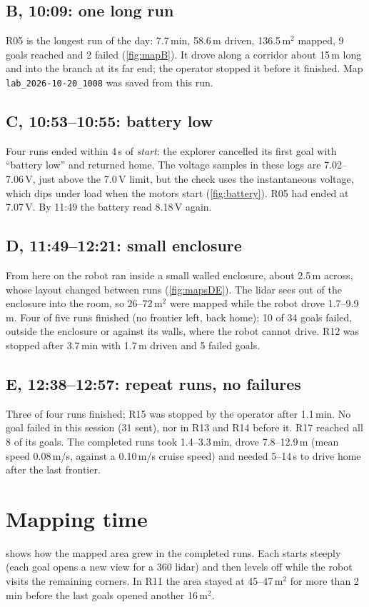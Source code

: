\documentclass[10pt]{article}
\begin{document}
\subsection*{B, 10:09: one long run}
R05 is the longest run of the day: 7.7\,min, 58.6\,m driven, 136.5\,m$^2$ mapped, 9 goals reached
and 2 failed (\cref{fig:mapB}). It drove along a corridor about 15\,m long and into the branch at its far end;
the operator stopped it before it finished. Map \texttt{lab\_2026-10-20\_1008} was saved from this run.

\subsection*{C, 10:53--10:55: battery low}
Four runs ended within 4\,s of \emph{start}: the explorer cancelled its first goal with
``battery low'' and returned home. The voltage samples in these logs are 7.02--7.06\,V, just above the
7.0\,V limit, but the check uses the instantaneous voltage, which dips under load when the motors start
(\cref{fig:battery}). R05 had ended at 7.07\,V. By 11:49 the battery read 8.18\,V again.

\subsection*{D, 11:49--12:21: small enclosure}
From here on the robot ran inside a small walled enclosure, about 2.5\,m across, whose layout changed between
runs (\cref{fig:mapsDE}). The lidar sees out of the enclosure into the room, so 26--72\,m$^2$ were mapped
while the robot drove 1.7--9.9\,m. Four of five runs finished (no frontier left, back home);
10 of 34 goals failed, outside the enclosure or against its walls, where the robot cannot drive. R12 was stopped
after 3.7\,min with 1.7\,m driven and 5 failed goals.

\subsection*{E, 12:38--12:57: repeat runs, no failures}
Three of four runs finished; R15 was stopped by the operator after 1.1\,min. No goal failed in this
session (31 sent), nor in R13 and R14 before it. R17 reached all 8 of its goals. The completed runs took 1.4--3.3\,min, drove 7.8--12.9\,m
(mean speed 0.08\,m/s, against a 0.10\,m/s cruise speed) and needed 5--14\,s to drive home after the last frontier.

\section{Mapping time}
 shows how the mapped area grew in the completed runs. Each starts steeply (each goal opens
a new view for a 360\textdegree{} lidar) and then levels off while the robot visits the remaining corners.
In R11 the area stayed at 45--47\,m$^2$ for more than 2\,min before the last goals opened another 16\,m$^2$.
\end{document}
